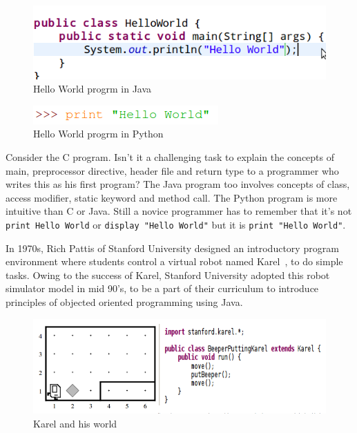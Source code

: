 \documentclass[conference]{IEEEtran}
\begin{document}
\begin{figure}[h]
\includegraphics[scale=0.4]{Fig_02.png}
\caption{Hello World progrm in Java}
\end{figure}

\begin{figure}[h]
\includegraphics[scale=0.4]{Fig_03.png}
\caption{Hello World progrm in Python}
\end{figure}

Consider the C program. Isn't it a challenging task to explain the concepts of main, preprocessor directive, header file and return type to a programmer who writes this as his first program? The Java program too involves concepts of class, access modifier, static keyword and method call. The Python program is more intuitive than C or Java. Still a novice programmer has to remember that it’s not \texttt{print Hello World}  or \texttt{display "Hello World"} but it is \texttt{print "Hello World"}. 

In 1970s, Rich Pattis of Stanford University designed an introductory program environment where students control a virtual robot named Karel~\cite{karel}, to do simple tasks. Owing to the success of Karel, Stanford University adopted this robot simulator model in mid 90’s, to be a part of their curriculum to introduce principles of objected oriented programming using Java.

\begin{figure}[h]
\centering
\includegraphics[scale=0.2]{Fig_04.png}
\caption{Karel and his world}
\end{figure}
\end{document}
